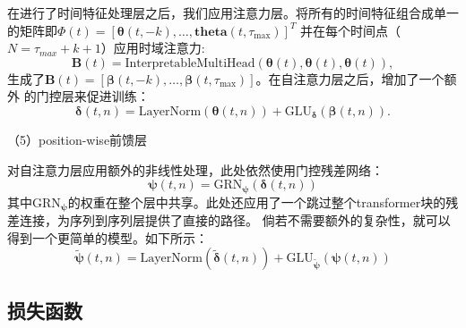 在进行了时间特征处理层之后，我们应用注意力层。将所有的时间特征组合成单一的矩阵即$\bm{\varPhi }(t) = \left[ \bm{\theta} (t, -k), \ldots, \bm{theta }(t, \tau_{\text{max}}) \right]^T$
并在每个时间点（$N = \tau _{max} + k + 1$）应用时域注意力:
\begin{equation}
    \mathbf{B}(t) = \text{InterpretableMultiHead}(\mathbf{\theta }(t), \mathbf{\theta }(t), \mathbf{\theta }(t)),
\end{equation}
生成了$\mathbf{B}(t) = \left[ \mathbf{\beta }(t, -k), \ldots, \mathbf{\beta }(t, \tau_{\max}) \right]$。在自注意力层之后，增加了一个额外
的门控层来促进训练：
\begin{equation}
    \boldsymbol{\delta}(t, n) = \text{LayerNorm}(\boldsymbol{\theta }(t, n)) + \text{GLU}_{\boldsymbol{\delta}}(\boldsymbol{\beta}(t, n)).
\end{equation}

（5）position-wise前馈层

对自注意力层应用额外的非线性处理，此处依然使用门控残差网络：
\begin{equation}
    \boldsymbol{\psi}(t, n) = \text{GRN}_{\boldsymbol{\psi}}(\boldsymbol{\delta}(t, n))
\end{equation}
其中$ \text{GRN}_{\boldsymbol{\psi}}$的权重在整个层中共享。此处还应用了一个跳过整个transformer块的残差连接，为序列到序列层提供了直接的路径。
倘若不需要额外的复杂性，就可以得到一个更简单的模型。如下所示：
\begin{equation}
    \tilde{\boldsymbol{\psi}}(t, n) = \text{LayerNorm}(\tilde{\boldsymbol{\delta}}(t, n)) + \text{GLU}_{\tilde{\boldsymbol{\psi}}}({\boldsymbol{\psi}}(t, n))
\end{equation}

\subsection{损失函数}


